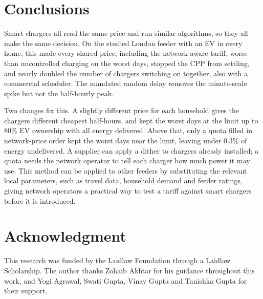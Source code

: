 \documentclass[conference]{IEEEtran}
\begin{document}
\section{Conclusions}

Smart chargers all read the same price and run similar algorithms, so they
all make the same decision. On the studied London feeder with an EV in every
home, this made every shared price, including the network-aware tariff, worse
than uncontrolled charging on the worst days, stopped the CPP from settling,
and nearly doubled the number of chargers switching on together, also with a
commercial scheduler. The mandated random delay removes the minute-scale
spike but not the half-hourly peak.

Two changes fix this. A slightly different price for each household gives the
chargers different cheapest half-hours, and kept the worst days at the limit
up to 80\% EV ownership with all energy delivered. Above that, only a quota
filled in network-price order kept the worst days near the limit, leaving
under 0.3\% of energy undelivered. A supplier can apply a dither to chargers
already installed; a quota needs the network operator to tell each charger
how much power it may use. This method can be applied to other feeders by
substituting the relevant local parameters, such as travel data, household
demand and feeder ratings, giving network operators a practical way to test a
tariff against smart chargers before it is introduced.

\section*{Acknowledgment}
This research was funded by the Laidlaw Foundation through a Laidlaw
Scholarship. The author thanks Zohaib Akhtar for his guidance throughout this
work, and Yogi Agrawal, Swati Gupta, Vinay Gupta and Tanishka Gupta for their
support.
\end{document}
